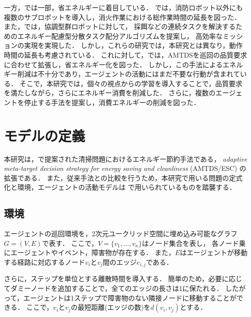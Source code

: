\documentclass[12pt,a4j,twoside]{jarticle}
\begin{document}
一方，\cite{Kim2016,Benkrid2019,Notomista2022,Kim2016,Wu2019,Latif2021}では一部，省エネルギーに着目している．
\cite{Kim2016}では，消防ロボット以外にも複数のサブロボットを導入し，消火作業における総作業時間の延長を図った．
また，\cite{Latif2021}では，協調型群ロボットに対して，
採餌などの連続タスクを解決するためのエネルギー配慮型分散タスク配分アルゴリズムを提案し，
高効率なミッションの実現を実現した．
しかし，これらの研究では，本研究とは異なり，動作時間の延長も考慮されている．
これに対して，\cite{Wu2019}では，AMTDSを巡回の品質要求に合わせて拡張し，省エネルギー化を図った．
しかし，この手法によるエネルギー削減は不十分であり，エージェントの活動にはまだ不要な行動が含まれている．
そこで，本研究では，個々の視点からの学習を導入することで，品質要求を満たしながら，さらにエネルギー消費を削減した．
さらに，複数のエージェントを停止する手法を提案し，消費エネルギーの削減を図った．

\section{モデルの定義}\label{sec:MACPP_model}
本研究は，\cite{Wu2019}で提案された清掃問題におけるエネルギー節約手法である，
{\em adaptive meta-target decision strategy for energy saving and cleanliness} (AMTDS/ESC)
の拡張である．
また，従来手法との比較を行うため，本研究で用いる問題の定式化と環境，エージェントの活動モデルは
\cite{Wu2019}で用いられているものを踏襲する．
\par

\subsection{環境}
エージェントの巡回環境を，2次元ユークリッド空間に埋め込み可能なグラフ$G = (V,E)$で表す．
ここで，$V = \{v_1, \dots, v_n \}$はノード集合を表し，
各ノード乗にエージェントやイベント，障害物が存在する．
また，$E$はエージェントが移動する経路に対応するノード$v_i$と$v_j$間のエッジ$e_{i,j}$である．
\par

さらに，ステップを単位とする離散時間を導入する．
簡単のため，必要に応じてダミーノードを追加することで，全てのエッジの長さは1に保たれる．
したがって，エージェントは1ステップで障害物のない隣接ノードに移動することができる．
ここで，$v_i$と$v_j$の最短距離(エッジの数)を$d(v_i,v_j)$とする．
\par
\end{document}
